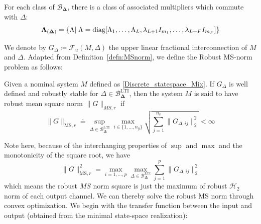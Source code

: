 For each class of $\mathcal{B}_{\bm{\Delta}}$, there is a class of associated multipliers which commute with $\Delta$:
$$
{\bf{\Lambda}}_{(\bm{\Delta})}=\{\Lambda \vert\; \Lambda=\mathrm{diag}[\Lambda_1,\hdots,\Lambda_L,\lambda_{L+1} I_{m_1},\hdots,\lambda_{L+F} I_{m_F}] \}
$$

We denote by $G_\Delta \coloneqq \mathcal{F}_u(M, \Delta)$ the upper linear fractional interconnection of $M$ and $\Delta$. Adapted from Definition~\ref{defn:MSnorm}, we define the Robust MS-norm problem as follows:
\begin{defn}\label{robust_MS.def}
Given a nominal system $M$ defined as \ref{Discrete_statespace_Mix}. If $G_\Delta$ is well defined and robustly stable for $\Delta\in\mathcal{B}_{\bm{\Delta}}^{\mathrm{LTI}}$,  then the system $M$ is said to have robust mean square norm $\|G\|_{MS,r}$ if 
\begin{equation*}
    \|G\|_{\mathrm{MS},r} \doteq \sup_{\Delta \in \mathcal{B}_{\bm{\Delta}}^{\mathrm{LTI}}}\max_{i \in \{1,\hdots,n_y\}}\sqrt{\sum_{j=1}^{n_v}{\|G_{\Delta,ij}\|_2^2}} < \infty
\end{equation*}
\end{defn}








Note here, because of the interchanging properties of $\sup$ and $\max$ and the monotonicity of the square root, we have 
\begin{equation*}
    \|G\|_{\mathrm{MS},r}^2=\max_{i=1,\hdots,p}\max_{\Delta \in \mathcal{B}_{\bm{\Delta}}^{\mathrm{LTI}}}\sum_{j=1}^p{\|G_{\Delta,ij}\|_2^2}
\end{equation*}
which means the robust $MS$ norm square is just the maximum of robust $\mathcal{H}_2$ norm of each output channel. We can thereby solve the robust MS norm through convex optimization.
We begin with the transfer function between the input and output (obtained from the minimal state-space realization):

